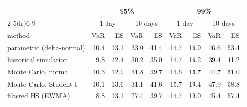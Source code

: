 \begin{tabular}{lrrrrrrrr}
\toprule
& \multicolumn{4}{c}{95\%} & \multicolumn{4}{c}{99\%} \\ \cmidrule(lr){2-5}\cmidrule(lr){6-9}& \multicolumn{2}{c}{1 day} & \multicolumn{2}{c}{10 days} & \multicolumn{2}{c}{1 day} & \multicolumn{2}{c}{10 days} \\
method & VaR & ES & VaR & ES & VaR & ES & VaR & ES \\
\midrule
parametric (delta-normal) & 10.4 & 13.1 & 33.0 & 41.4 & 14.7 & 16.9 & 46.6 & 53.4 \\
historical simulation & 9.8 & 12.4 & 30.2 & 35.0 & 14.7 & 16.2 & 39.4 & 41.2 \\
Monte Carlo, normal & 10.3 & 12.9 & 31.8 & 39.7 & 14.6 & 16.7 & 44.7 & 51.0 \\
Monte Carlo, Student t & 10.1 & 13.6 & 31.1 & 41.6 & 15.7 & 19.4 & 47.9 & 58.8 \\
filtered HS (EWMA) & 8.8 & 13.1 & 27.4 & 39.7 & 14.7 & 19.0 & 45.4 & 57.4 \\
\bottomrule
\end{tabular}
